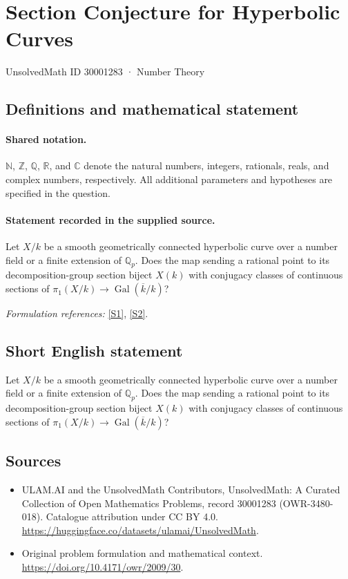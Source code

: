 \documentclass[11pt]{article}
\newcommand{\sref}[2]{\hyperlink{source:#1:#2}{[S#2]}}
\begin{document}
\setcounter{section}{30001282}
\section{Section Conjecture for Hyperbolic Curves}\label{30001283}
{\small UnsolvedMath ID 30001283 · Number Theory}
\subsection{Definitions and mathematical statement}

\paragraph{Shared notation.}$\mathbb N$, $\mathbb Z$, $\mathbb Q$, $\mathbb R$, and $\mathbb C$ denote the natural numbers, integers, rationals, reals, and complex numbers, respectively. All additional parameters and hypotheses are specified in the question.


\paragraph{Statement recorded in the supplied source.}
Let $X/k$ be a smooth geometrically connected hyperbolic curve over a number field or a finite extension of $\mathbb Q_p$. Does the map sending a rational point to its decomposition-group section biject $X(k)$ with conjugacy classes of continuous sections of $\pi_1(X/k)\to\operatorname{Gal}(\overline k/k)$?
\par\smallskip\textit{Formulation references:} \sref{30001283}{1}, \sref{30001283}{2}.
\subsection{Short English statement}
Let $X/k$ be a smooth geometrically connected hyperbolic curve over a number field or a finite extension of $\mathbb Q_p$. Does the map sending a rational point to its decomposition-group section biject $X(k)$ with conjugacy classes of continuous sections of $\pi_1(X/k)\to\operatorname{Gal}(\overline k/k)$?
\subsection{Sources}
\begin{itemize}
\item[\hypertarget{source:30001283:1}{S1}] ULAM.AI and the UnsolvedMath Contributors, UnsolvedMath: A Curated Collection of Open Mathematics Problems, record 30001283 (OWR-3480-018). Catalogue attribution under CC BY 4.0.
\url{https://huggingface.co/datasets/ulamai/UnsolvedMath}.
\item[\hypertarget{source:30001283:2}{S2}] Original problem formulation and mathematical context.
\url{https://doi.org/10.4171/owr/2009/30}.
\end{itemize}
\label{end:30001283}
\end{document}
